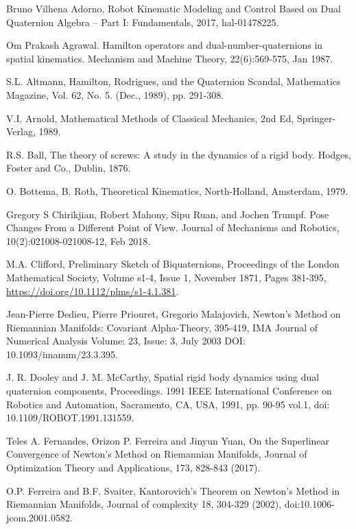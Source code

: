 \documentclass[reqno,12pt]{amsart}
\begin{document}
\begin{thebibliography}{99}

 Bruno Vilhena Adorno, Robot Kinematic Modeling and Control Based on Dual Quaternion Algebra -- Part I: Fundamentals, 2017, hal-01478225.

 Om Prakash Agrawal. Hamilton operators and dual-number-quaternions in spatial kinematics. Mechanism and Machine Theory, 22(6):569-575, Jan 1987.

 S.L. Altmann, Hamilton, Rodrigues, and the Quaternion Scandal, Mathematics Magazine, Vol. 62, No. 5. (Dec., 1989), pp. 291-308.

 V.I. Arnold, Mathematical Methods of Classical Mechanics, 2nd Ed, Springer-Verlag, 1989.

 R.S. Ball, The theory of screws: A study in the dynamics of a rigid body. Hodges, Foster and Co., Dublin, 1876.

 O. Bottema, B. Roth, Theoretical Kinematics, North-Holland, Amsterdam, 1979.

 Gregory S Chirikjian, Robert Mahony, Sipu Ruan, and Jochen Trumpf. Pose Changes From a Different Point of View. Journal of Mechanisms and Robotics, 10(2):021008-021008-12, Feb 2018.

 M.A. Clifford, Preliminary Sketch of Biquaternions, Proceedings of the London Mathematical Society, Volume s1-4, Issue 1, November 1871, Pages 381-395, \url{https://doi.org/10.1112/plms/s1-4.1.381}.

 Jean-Pierre Dedieu, Pierre Priouret, Gregorio Malajovich, Newton’s Method on Riemannian Manifolds: Covariant Alpha-Theory, 395-419, IMA Journal of Numerical Analysis Volume: 23, Issue: 3, July 2003 DOI: 10.1093/imanum/23.3.395.

 J. R. Dooley and J. M. McCarthy, Spatial rigid body dynamics using dual quaternion components, Proceedings. 1991 IEEE International Conference on Robotics and Automation, Sacramento, CA, USA, 1991, pp. 90-95 vol.1, doi: 10.1109/ROBOT.1991.131559.

 Teles A. Fernandes, Orizon P. Ferreira and Jinyun Yuan, On the Superlinear Convergence of Newton’s Method on Riemannian Manifolds, Journal of Optimization Theory and Applications, 173, 828-843 (2017).

 O.P. Ferreira and B.F. Svaiter, Kantorovich's Theorem on Newton's Method in Riemannian Manifolds, Journal of complexity 18, 304-329 (2002), doi:10.1006-jcom.2001.0582.


\end{thebibliography}
\end{document}
